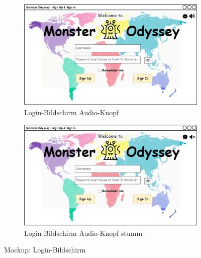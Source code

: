 \begin{figure}[H]
    \centering
    \begin{subfigure}[b]{0.4\textwidth}
        \includegraphics[width=\textwidth]{images/mockups/Bonusfeatures/AudioIngame/Login.png}
        \caption{Login-Bildschirm Audio-Knopf}
        \label{fig: Login-Bildschirm Audio-Knopf}
    \end{subfigure}
    \hfill
    \begin{subfigure}[b]{0.4\textwidth}
        \includegraphics[width=\textwidth]{images/mockups/Bonusfeatures/AudioIngame/LoginMuted.png}
        \caption{Login-Bildschirm Audio-Knopf stumm}
        \label{fig: Login-Bildschirm Audio-Knopf stumm}
    \end{subfigure}
    \caption{Mockup: Login-Bildschirm}
    \label{fig: Login-Bildschirm}
\end{figure}
